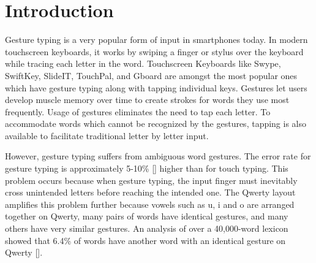 \documentclass[MTech]{iitmdiss}
\begin{document}




\clearpage




\chapter{Introduction}
\label{chap:intro}


Gesture typing is a very popular form of input in smartphones today. In modern touchscreen keyboards, it works by swiping a finger or stylus over the keyboard while tracing each letter in the word. Touchscreen Keyboards like Swype, SwiftKey, SlideIT, TouchPal, and Gboard are amongst the most popular ones which have gesture typing along with tapping individual keys. Gestures let users develop muscle memory over time to create strokes for words they use most frequently. Usage of gestures eliminates the need to tap each letter. To accommodate words which cannot be recognized by the gestures, tapping is also available to facilitate traditional letter by letter input.


However, gesture typing suffers from ambiguous word gestures. The error rate for gesture typing is approximately 5-10\% [\cite{evaluation}] higher than for touch typing.  This problem occurs because when gesture typing, the input finger must inevitably cross unintended letters before reaching the intended one. The Qwerty layout amplifies this problem further because vowels such as u, i and o are arranged together on Qwerty, many pairs of words have
identical gestures, and many others have very similar gestures. An analysis of over a 40,000-word lexicon showed that 6.4\% of words have another word with an identical gesture on Qwerty [\cite{gesturerecog}].
\end{document}
